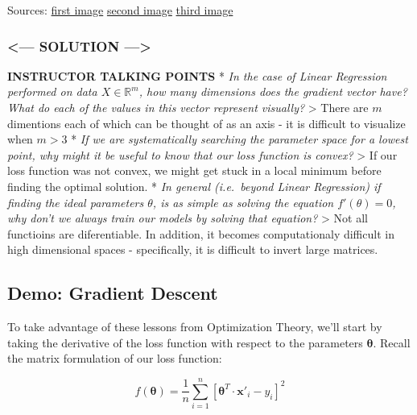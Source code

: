 \documentclass[11pt]{article}
\begin{document}
    Sources:
\href{http://fa.bianp.net/blog/2014/surrogate-loss-functions-in-machine-learning/}{first
image} \textbar{}
\href{https://blog.algorithmia.com/introduction-to-loss-functions/}{second
image} \textbar{}
\href{https://fr.mathworks.com/help/gads/example-finding-the-minimum-of-a-function-using-the-gps-algorithm.html}{third
image}

    \hypertarget{solution}{%
\subsubsection{\textless{}--- SOLUTION
---\textgreater{}}\label{solution}}

\textbf{INSTRUCTOR TALKING POINTS} * \emph{In the case of Linear
Regression performed on data \(X \in \mathbb{R}^m\), how many dimensions
does the gradient vector have? What do each of the values in this vector
represent visually?} \textgreater{} There are \(m\) dimentions each of
which can be thought of as an axis - it is difficult to visualize when
\(m > 3\) * \emph{If we are systematically searching the parameter space
for a lowest point, why might it be useful to know that our loss
function is convex?} \textgreater{} If our loss function was not convex,
we might get stuck in a local minimum before finding the optimal
solution. * \emph{In general (i.e.~beyond Linear Regression) if finding
the ideal parameters \(\theta\), is as simple as solving the equation
\(f'(\theta)=0\), why don't we always train our models by solving that
equation?} \textgreater{} Not all functioins are diferentiable. In
addition, it becomes computationaly difficult in high dimensional spaces
- specifically, it is difficult to invert large matrices.

    \hypertarget{demo-gradient-descent}{%
\subsection{Demo: Gradient Descent}\label{demo-gradient-descent}}

    To take advantage of these lessons from Optimization Theory, we'll start
by taking the derivative of the loss function with respect to the
parameters \(\boldsymbol{\theta}\). Recall the matrix formulation of our
loss function:

\begin{equation}\tag{1.3}
f(\boldsymbol{\theta}) = \frac{1}{n}\sum_{i=1}^{n}\left[ \boldsymbol{\theta}^T\cdot\mathbf{x}'_i - y_i\right]^2
\end{equation}
\end{document}
